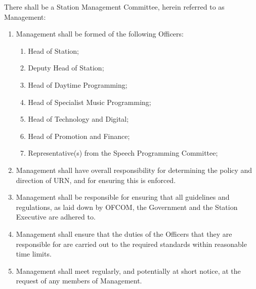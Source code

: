 \item There shall be a Station Management Committee, herein referred to as Management:
\begin{enumerate}[label*=\arabic*.]
    \item Management shall be formed of the following Officers:
          \begin{enumerate}[label*=\arabic*.]
              \item Head of Station;
              \item Deputy Head of Station;
              \item Head of Daytime Programming;
              \item Head of Specialist Music Programming;
              \item Head of Technology and Digital;
              \item Head of Promotion and Finance;
              \item Representative(s) from the Speech Programming Committee;
          \end{enumerate}
    \item Management shall have overall responsibility for determining the policy and direction of URN, and for ensuring this is enforced.
    \item Management shall be responsible for ensuring that all guidelines and regulations, as laid down by OFCOM, the Government and the Station Executive are adhered to.
    \item Management shall ensure that the duties of the Officers that they are responsible for are carried out to the required standards within reasonable time limits.
    \item Management shall meet regularly, and potentially at short notice, at the request of any members of Management.
\end{enumerate}
